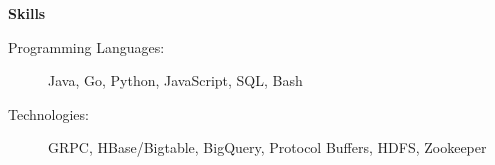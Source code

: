 \documentclass[letterpaper,11pt]{article}
\newcommand{\resheading}[1]{{\large \colorbox{mygrey}{\begin{minipage}{\textwidth}{\textbf{#1 \vphantom{p\^{E}}}}\end{minipage}}}}
\begin{document}
\resheading{Skills}
\begin{description}
	\item[Programming Languages:] { \footnotesize
	      Java, Go, Python, JavaScript, SQL, Bash
	}
	\item[Technologies:] { \footnotesize
	      GRPC, HBase/Bigtable, BigQuery, Protocol Buffers, HDFS, Zookeeper
	}
\end{description} %

\end{document}
